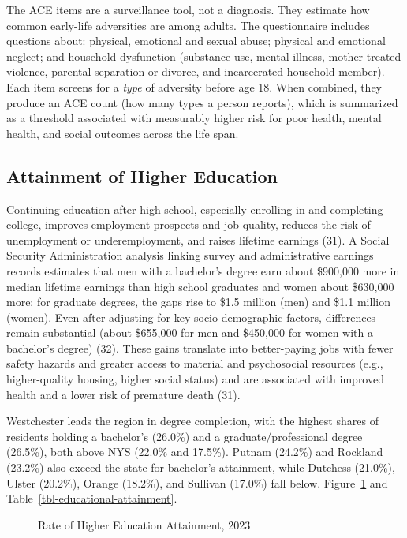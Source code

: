 \documentclass[
  english,
  letterpaper,
]{report}
\begin{document}
The ACE items are a surveillance tool, not a diagnosis. They estimate
how common early-life adversities are among adults. The questionnaire
includes questions about: physical, emotional and sexual abuse; physical
and emotional neglect; and household dysfunction (substance use, mental
illness, mother treated violence, parental separation or divorce, and
incarcerated household member). Each item screens for a \emph{type} of
adversity before age 18. When combined, they produce an ACE count (how
many types a person reports), which is summarized as a threshold
associated with measurably higher risk for poor health, mental health,
and social outcomes across the life span.

\subsection{Attainment of Higher
Education}\label{attainment-of-higher-education}

Continuing education after high school, especially enrolling in and
completing college, improves employment prospects and job quality,
reduces the risk of unemployment or underemployment, and raises lifetime
earnings (31). A Social Security Administration analysis linking survey
and administrative earnings records estimates that men with a bachelor's
degree earn about \$900,000 more in median lifetime earnings than high
school graduates and women about \$630,000 more; for graduate degrees,
the gaps rise to \$1.5 million (men) and \$1.1 million (women). Even
after adjusting for key socio-demographic factors, differences remain
substantial (about \$655,000 for men and \$450,000 for women with a
bachelor's degree) (32). These gains translate into better-paying jobs
with fewer safety hazards and greater access to material and
psychosocial resources (e.g., higher-quality housing, higher social
status) and are associated with improved health and a lower risk of
premature death (31).

Westchester leads the region in degree completion, with the highest
shares of residents holding a bachelor's (26.0\%) and a
graduate/professional degree (26.5\%), both above NYS (22.0\% and
17.5\%). Putnam (24.2\%) and Rockland (23.2\%) also exceed the state for
bachelor's attainment, while Dutchess (21.0\%), Ulster (20.2\%), Orange
(18.2\%), and Sullivan (17.0\%) fall below.
Figure~\ref{fig-educational-attainment} and
Table~\ref{tbl-educational-attainment}.

\begin{figure}


\caption{\label{fig-educational-attainment}Rate of Higher Education
Attainment, 2023}

\end{figure}%
\end{document}
